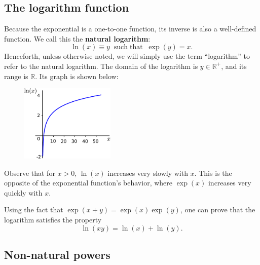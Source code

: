 \documentclass[10pt,a4paper]{article}
\begin{document}
\subsection{The logarithm function}
\label{the-logarithm-function}

Because the exponential is a one-to-one function, its inverse is also a
well-defined function. We call this the \textbf{natural logarithm}:
\begin{equation}
\ln(x) \equiv y \;\; \mathrm{such}\;\mathrm{that}\;\;\exp(y) = x.
\end{equation}
Henceforth, unless otherwise noted, we will simply use the term
``logarithm'' to refer to the natural logarithm. The domain of the
logarithm is $y \in \mathbb{R}^+$, and its range is $\mathbb{R}$.  Its
graph is shown below:

\begin{figure}[h]
  \centering\includegraphics[width=0.4\textwidth]{logarithm}
\end{figure}
\noindent
Observe that for $x>0$, $\ln(x)$ increases very slowly with $x$. This
is the opposite of the exponential function's behavior, where
$\exp(x)$ increases very quickly with $x$.

Using the fact that $\exp(x+y) = \exp(x)\exp(y)$, one can prove that
the logarithm satisfies the property
\begin{equation}
\ln(xy) = \ln(x) + \ln(y).
\end{equation}

\subsection{Non-natural powers}
\end{document}
